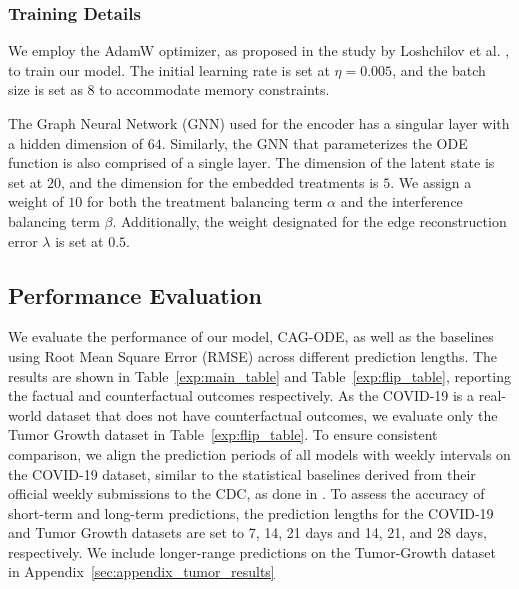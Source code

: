 \subsubsection{Training Details}
We employ the AdamW optimizer, as proposed in the study by Loshchilov et al. \cite{loshchilovdecoupled}, to train our model. The initial learning rate is set at $\eta = 0.005$, and the batch size is set as $8$ to accommodate memory constraints.

The Graph Neural Network (GNN) used for the encoder has a singular layer with a hidden dimension of $64$. Similarly, the GNN that parameterizes the ODE function is also comprised of a single layer. The dimension of the latent state is set at $20$, and the dimension for the embedded treatments is $5$. We assign a weight of $10$ for both the treatment balancing term $\alpha$ and the interference balancing term $\beta$. Additionally, the weight designated for the edge reconstruction error $\lambda$ is set at $0.5$.


\subsection{Performance Evaluation}
We evaluate the performance of our model, CAG-ODE, as well as the baselines using Root Mean Square Error (RMSE) across different prediction lengths. The results are shown in Table~\ref{exp:main_table} and Table~\ref{exp:flip_table}, reporting the factual and counterfactual outcomes respectively. As the COVID-19 is a real-world dataset that does not have counterfactual outcomes, we evaluate only the Tumor Growth dataset in Table~\ref{exp:flip_table}. To ensure consistent comparison, we align the prediction periods of all models with weekly intervals on the COVID-19 dataset, similar to the statistical baselines derived from their official weekly submissions to the CDC, as done in \cite{huang2021coupled}. To assess the accuracy of short-term and long-term predictions, the prediction lengths for the COVID-19 and Tumor Growth datasets are set to 7, 14, 21 days and 14, 21, and 28 days, respectively. We include longer-range predictions on the Tumor-Growth dataset in Appendix~\ref{sec:appendix_tumor_results}



